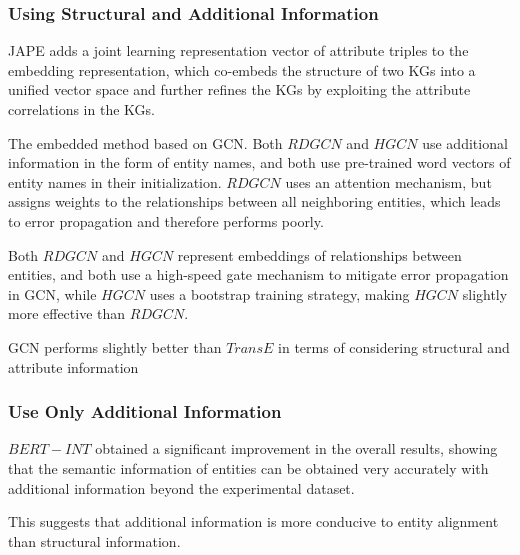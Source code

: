 \documentclass[sigconf]{acmart}
\begin{document}
{\subsubsection{Using Structural and Additional Information}

 JAPE \cite{sun2017cross} adds a joint learning representation vector of attribute triples to the embedding representation, which co-embeds the structure of two KGs into a unified vector space and further refines the KGs by exploiting the attribute correlations in the KGs.

 The embedded method based on GCN. Both $RDGCN$ and $HGCN$ use additional information in the form of entity names, and both use pre-trained word vectors of entity names in their initialization. $RDGCN$ uses an attention mechanism, but assigns weights to the relationships between all neighboring entities, which leads to error propagation and therefore performs poorly.

 Both $RDGCN$ and $HGCN$ represent embeddings of relationships between entities, and both use a high-speed gate mechanism to mitigate error propagation in GCN, while $HGCN$ uses a bootstrap training strategy, making $HGCN$ slightly more effective than $RDGCN$.

 GCN performs slightly better than $TransE$ in terms of considering structural and attribute information

\subsubsection{Use Only Additional Information}

$BERT-INT$ \cite{tang2020bert} obtained a significant improvement in the overall results, showing that the semantic information of entities can be obtained very accurately with additional information beyond the experimental dataset.

This suggests that additional information is more conducive to entity alignment than structural information.

}
\end{document}
